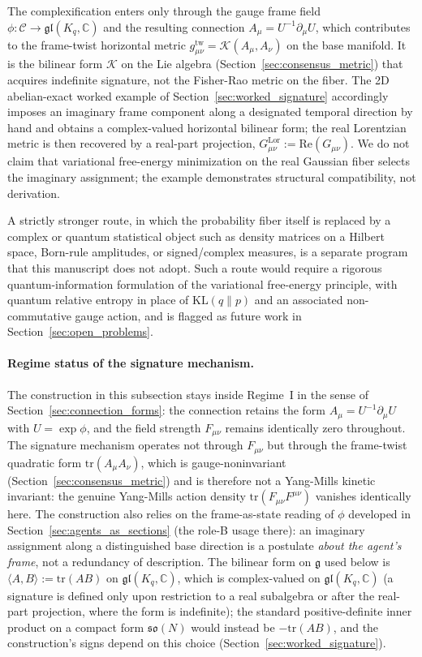\documentclass[11pt]{article}
\begin{document}
The complexification enters only through the gauge frame field $\phi: \mathcal{C} \to \mathfrak{gl}(K_q, \mathbb{C})$ and the resulting connection $A_\mu = U^{-1} \partial_\mu U$, which contributes to the frame-twist horizontal metric $g^{\mathrm{tw}}_{\mu\nu} = \mathcal{K}(A_\mu, A_\nu)$ on the base manifold. It is the bilinear form $\mathcal{K}$ on the Lie algebra (Section~\ref{sec:consensus_metric}) that acquires indefinite signature, not the Fisher-Rao metric on the fiber. The 2D abelian-exact worked example of Section~\ref{sec:worked_signature} accordingly imposes an imaginary frame component along a designated temporal direction by hand and obtains a complex-valued horizontal bilinear form; the real Lorentzian metric is then recovered by a real-part projection, $G^{\mathrm{Lor}}_{\mu\nu} := \mathrm{Re}(G_{\mu\nu})$. We do not claim that variational free-energy minimization on the real Gaussian fiber selects the imaginary assignment; the example demonstrates structural compatibility, not derivation.

A strictly stronger route, in which the probability fiber itself is replaced by a complex or quantum statistical object such as density matrices on a Hilbert space, Born-rule amplitudes, or signed/complex measures, is a separate program that this manuscript does not adopt. Such a route would require a rigorous quantum-information formulation of the variational free-energy principle, with quantum relative entropy in place of $\mathrm{KL}(q \| p)$ and an associated non-commutative gauge action, and is flagged as future work in Section~\ref{sec:open_problems}.

\paragraph{Regime status of the signature mechanism.} The construction in this subsection stays inside Regime~I in the sense of Section~\ref{sec:connection_forms}: the connection retains the form $A_\mu = U^{-1}\partial_\mu U$ with $U = \exp\phi$, and the field strength $F_{\mu\nu}$ remains identically zero throughout. The signature mechanism operates not through $F_{\mu\nu}$ but through the frame-twist quadratic form $\mathrm{tr}(A_\mu A_\nu)$, which is gauge-noninvariant (Section~\ref{sec:consensus_metric}) and is therefore not a Yang-Mills kinetic invariant: the genuine Yang-Mills action density $\mathrm{tr}(F_{\mu\nu}F^{\mu\nu})$ vanishes identically here. The construction also relies on the frame-as-state reading of $\phi$ developed in Section~\ref{sec:agents_as_sections} (the role-B usage there): an imaginary assignment along a distinguished base direction is a postulate \emph{about the agent's frame}, not a redundancy of description. The bilinear form on $\mathfrak{g}$ used below is $\langle A, B\rangle := \mathrm{tr}(AB)$ on $\mathfrak{gl}(K_q, \mathbb{C})$, which is complex-valued on $\mathfrak{gl}(K_q, \mathbb{C})$ (a signature is defined only upon restriction to a real subalgebra or after the real-part projection, where the form is indefinite); the standard positive-definite inner product on a compact form $\mathfrak{so}(N)$ would instead be $-\mathrm{tr}(AB)$, and the construction's signs depend on this choice (Section~\ref{sec:worked_signature}).
\end{document}

